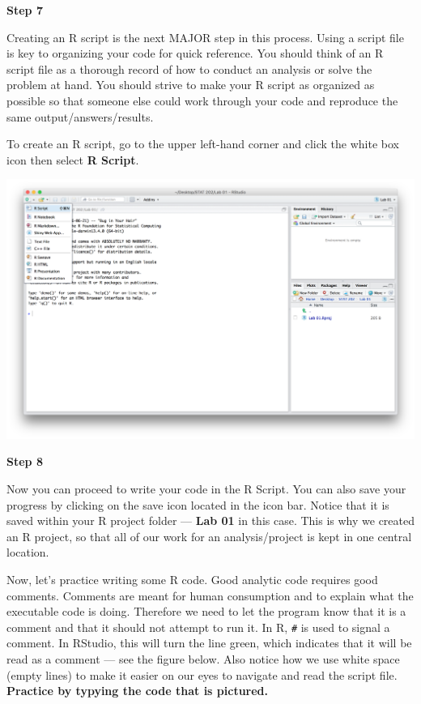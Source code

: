 \documentclass[]{book}
\theoremstyle{definition}
\theoremstyle{definition}
\theoremstyle{definition}
\theoremstyle{remark}
\begin{document}
\textbf{Step 7}

Creating an R script is the next MAJOR step in this process. Using a
script file is key to organizing your code for quick reference. You
should think of an R script file as a thorough record of how to conduct
an analysis or solve the problem at hand. You should strive to make your
R script as organized as possible so that someone else could work
through your code and reproduce the same output/answers/results.

To create an R script, go to the upper left-hand corner and click the
white box icon then select \textbf{R Script}.

\includegraphics{./assets/images/01-06.png}

\textbf{Step 8}

Now you can proceed to write your code in the R Script. You can also
save your progress by clicking on the save icon located in the icon bar.
Notice that it is saved within your R project folder --- \textbf{Lab 01}
in this case. This is why we created an R project, so that all of our
work for an analysis/project is kept in one central location.

Now, let's practice writing some R code. Good analytic code requires
good comments. Comments are meant for human consumption and to explain
what the executable code is doing. Therefore we need to let the program
know that it is a comment and that it should not attempt to run it. In
R, \texttt{\#} is used to signal a comment. In RStudio, this will turn
the line green, which indicates that it will be read as a comment ---
see the figure below. Also notice how we use white space (empty lines)
to make it easier on our eyes to navigate and read the script file.
\textbf{Practice by typying the code that is pictured.}
\end{document}
